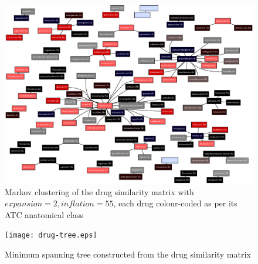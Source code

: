 \documentclass[12pt,a4paper,twoside,openright]{report}
\begin{document}
\begin{landscape}
	\begin{figure}[!htb]
		\includegraphics[height=\textwidth]{drug-cluster-3.eps}
		\caption{Markov clustering of the drug similarity matrix with $\mathit{expansion}=2, \mathit{inflation}=55$, each drug colour-coded as per its ATC anatomical class}
		\label{fig:drug-cluster-3}
	\end{figure}
	
\end{landscape}

\begin{landscape}
	
	\begin{figure}[!htb]
		\texttt{[image: drug-tree.eps]}
		\caption{Minimum spanning tree constructed from the drug similarity matrix}
		\label{fig:drug-tree}
	\end{figure}
	
\end{landscape}

%	
%	
%
%	
%	
\end{document}
